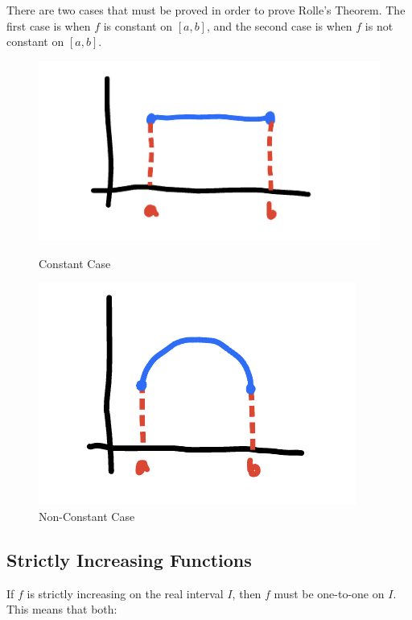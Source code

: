 \documentclass{article}
\begin{document}
There are two cases that must be proved in order to prove Rolle's Theorem. The first case is when $f$ is constant on $[a,b]$, and the second case is when $f$ is not constant on $[a,b]$.

\begin{figure}[!htb]
    \centering
    \begin{minipage}{0.45\textwidth}
        \centering
        \includegraphics[scale=0.25]{rolles-theorem-case-a.jpeg}
        \caption{Constant Case}
        \label{fig:rolles-theorem-case-a}
    \end{minipage}\hfill
    \begin{minipage}{0.45\textwidth}
        \centering
        \includegraphics[scale=0.25]{rolles-theorem-case-b.jpeg}
        \caption{Non-Constant Case}
        \label{fig:rolles-theorem-case-b}
    \end{minipage}
\end{figure}

\subsection*{Strictly Increasing Functions}

If $f$ is strictly increasing on the real interval $I$, then $f$ must be one-to-one on $I$. This means that both:
\end{document}
